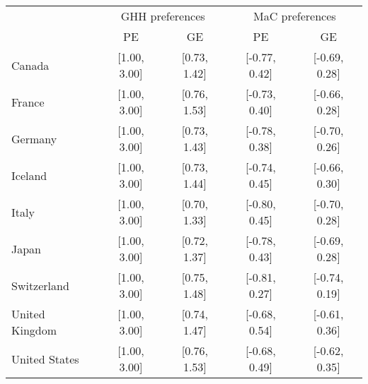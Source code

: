 \begin{tabular}{lcccc} 
& \multicolumn{2}{c}{GHH preferences}   & \multicolumn{2}{c}{MaC preferences}   \tabularnewline 
& PE                & GE                & PE                & GE                \tabularnewline 
\hline 
\hline 
Canada & {[}1.00, 3.00{]} & {[}0.73, 1.42{]} & {[}-0.77, 0.42{]} & {[}-0.69, 0.28{]} \tabularnewline 
France & {[}1.00, 3.00{]} & {[}0.76, 1.53{]} & {[}-0.73, 0.40{]} & {[}-0.66, 0.28{]} \tabularnewline 
Germany & {[}1.00, 3.00{]} & {[}0.73, 1.43{]} & {[}-0.78, 0.38{]} & {[}-0.70, 0.26{]} \tabularnewline 
Iceland & {[}1.00, 3.00{]} & {[}0.73, 1.44{]} & {[}-0.74, 0.45{]} & {[}-0.66, 0.30{]} \tabularnewline 
Italy & {[}1.00, 3.00{]} & {[}0.70, 1.33{]} & {[}-0.80, 0.45{]} & {[}-0.70, 0.28{]} \tabularnewline 
Japan & {[}1.00, 3.00{]} & {[}0.72, 1.37{]} & {[}-0.78, 0.43{]} & {[}-0.69, 0.28{]} \tabularnewline 
Switzerland & {[}1.00, 3.00{]} & {[}0.75, 1.48{]} & {[}-0.81, 0.27{]} & {[}-0.74, 0.19{]} \tabularnewline 
United Kingdom & {[}1.00, 3.00{]} & {[}0.74, 1.47{]} & {[}-0.68, 0.54{]} & {[}-0.61, 0.36{]} \tabularnewline 
United States & {[}1.00, 3.00{]} & {[}0.76, 1.53{]} & {[}-0.68, 0.49{]} & {[}-0.62, 0.35{]} \tabularnewline 
\hline 
\end{tabular} 
